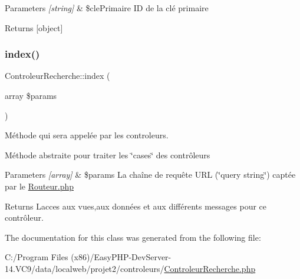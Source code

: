 \begin{DoxyParams}{Parameters}
{\em \mbox{[}string\mbox{]}} & \$cle\+Primaire ID de la clé primaire \\
\hline
\end{DoxyParams}
\begin{DoxyReturn}{Returns}
\mbox{[}object\mbox{]} 
\end{DoxyReturn}
\mbox{\label{class_controleur_recherche_a1744ef8ed9e924c25f247a5699c4cd99}} 
\subsubsection{\texorpdfstring{index()}{index()}}
{\footnotesize\ttfamily Controleur\+Recherche\+::index (\begin{DoxyParamCaption}\item[{array}]{\$params }\end{DoxyParamCaption})}



Méthode qui sera appelée par les controleurs. 

Méthode abstraite pour traiter les \char`\"{}cases\char`\"{} des contrôleurs 
\begin{DoxyParams}{Parameters}
{\em \mbox{[}array\mbox{]}} & \$params La chaîne de requête U\+RL (\char`\"{}query string\char`\"{}) captée par le \hyperlink{_routeur_8php}{Routeur.\+php} \\
\hline
\end{DoxyParams}
\begin{DoxyReturn}{Returns}
L\textquotesingle{}acces aux vues,aux données et aux différents messages pour ce contrôleur. 
\end{DoxyReturn}


The documentation for this class was generated from the following file\+:\begin{DoxyCompactItemize}
\item 
C\+:/\+Program Files (x86)/\+Easy\+P\+H\+P-\/\+Dev\+Server-\/14.\+V\+C9/data/localweb/projet2/controleurs/\hyperlink{_controleur_recherche_8php}{Controleur\+Recherche.\+php}\end{DoxyCompactItemize}
